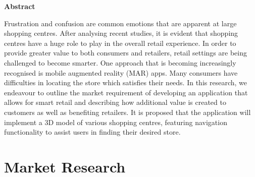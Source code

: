 \documentclass[12pt]{report}
\newcommand\blankpage{%
    \null
    \thispagestyle{empty}%
    \addtocounter{page}{-1}%
    \newpage}
\begin{document}
\begin{center}    
    \large
    \textbf{Abstract}\\
\end{center}
Frustration and confusion are common emotions that are apparent at large shopping centres. After analysing recent studies, it is evident that shopping centres have a huge role to play in the overall retail experience. In order to provide greater value to both consumers and retailers, retail settings are being challenged to become smarter. One approach that is becoming increasingly recognised is mobile augmented reality (MAR) apps. Many consumers have difficulties in locating the store which satisfies their needs. In this research, we endeavour to outline the market requirement of developing an application that allows for smart retail and describing how additional value is created to customers as well as benefiting retailers. It is proposed that the application will implement a 3D model of various shopping centres, featuring navigation functionality to assist users in finding their desired store.\\

\tableofcontents
\afterpage{\blankpage}

\chapter{Market Research}










%
%
\end{document}
